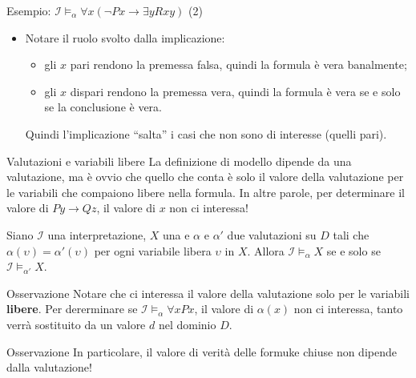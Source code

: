 \documentclass[aspectratio=169,10pt,dvipsnames,xcolor=table,handout]{beamer}
\newcommand{\mcI}{\mathcal{I}}
\begin{document}
\begin{frame}{Esempio: $\mcI \models_\alpha \forall x (\neg P x \to \exists y Rxy)$ (2)}
\begin{itemize}[<+->]
\begin{itemize}
\begin{itemize}
                              \uncover<10->{
                                  \smallskip
                                  \qquad $\mcI \models_{\alpha[x \mapsto 1]} \neg P x$ \only<.|handout:0>{?}\uncover<+->{\xmark}
                              }
                          \item<12-> $\mcI \models_{\alpha[x \mapsto 1]} \exists y Rxy$ \only<.-13|handout:0>{?}
                      \end{itemize}
                  \item<16-> per gli altri valori di $x$, tutto procedece come il caso $x \mapsto 0$ o $x \mapsto 1$ a seconda se il numero è pari o dispari.
              \end{itemize}
        \item<18-> Notare il ruolo svolto dalla implicazione:
            \begin{itemize}
                \item gli $x$ pari rendono la premessa falsa, quindi la formula è vera banalmente;
                \item gli $x$ dispari rendono la premessa vera, quindi la formula è vera se e solo se la conclusione è vera.
            \end{itemize}
            Quindi l'implicazione ``salta'' i casi che non sono di interesse (quelli pari).
    \end{itemize}
\end{frame}

\begin{frame}{Valutazioni e variabili libere}
    La definizione di modello dipende da una valutazione, ma è ovvio che quello che conta è solo il valore della valutazione per le variabili che compaiono libere nella formula. In altre parole, per determinare il valore di $Py \to Qz$, il valore di $x$ non ci interessa!
    \begin{theorem}
        Siano $\mcI$ una interpretazione, $X$ una \fbf e $\alpha$ e $\alpha'$ due valutazioni su $D$ tali che $\alpha(\upsilon) = \alpha'(\upsilon)$ per ogni variabile libera $\upsilon$ in $X$. Allora $\mcI \models_\alpha X$ se e solo se $\mcI \models_{\alpha'} X$.
    \end{theorem}
    \begin{block}{Osservazione}
        Notare che ci interessa il valore della valutazione solo per le variabili \textbf{libere}. Per dererminare se $\mcI \models_\alpha \forall x Px$, il valore di $\alpha(x)$ non ci interessa, tanto verrà sostituito da un valore $d$ nel dominio $D$.
    \end{block}
    \begin{block}{Osservazione}
        In particolare, il valore di verità delle formuke chiuse non dipende dalla valutazione!
    \end{block}
\end{frame}
\end{document}
